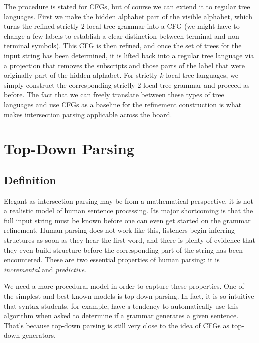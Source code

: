 The procedure is stated for CFGs, but of course we can extend it to regular tree languages.
First we make the hidden alphabet part of the visible alphabet, which turns the refined strictly $2$-local tree grammar into a CFG (we might have to change a few labels to establish a clear distinction between terminal and non-terminal symbols).
This CFG is then refined, and once the set of trees for the input string has been determined, it is lifted back into a regular tree language via a projection that removes the subscripts and those parts of the label that were originally part of the hidden alphabet.
For strictly $k$-local tree languages, we simply construct the corresponding strictly $2$-local tree grammar and proceed as before.
The fact that we can freely translate between these types of tree languages and use CFGs as a baseline for the refinement construction is what makes intersection parsing applicable across the board.

\section{Top-Down Parsing}

\subsection{Definition}
Elegant as intersection parsing may be from a mathematical perspective, it is not a realistic model of human sentence processing.
Its major shortcoming is that the full input string must be known before one can even get started on the grammar refinement.
Human parsing does not work like this, listeners begin inferring structures as soon as they hear the first word, and there is plenty of evidence that they even build structure before the corresponding part of the string has been encountered.
These are two essential properties of human parsing: it is \emph{incremental} and \emph{predictive}.

We need a more procedural model in order to capture these properties.
One of the simplest and best-known models is top-down parsing.
In fact, it is so intuitive that syntax students, for example, have a tendency to automatically use this algorithm when asked to determine if a grammar generates a given sentence.
That's because top-down parsing is still very close to the idea of CFGs as top-down generators.


